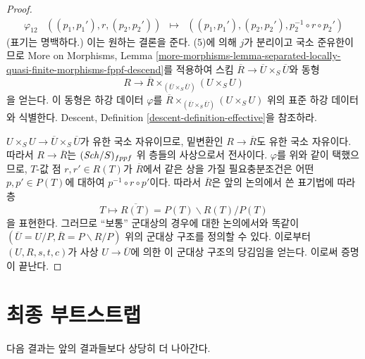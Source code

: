 \begin{proof}
$$\begin{matrix}
\varphi_{12} & ((p_1, p_1'), r, (p_2, p_2')) & \mapsto &
((p_1, p_1'), (p_2, p_2'), p_2^{-1} \circ r \circ p_2')
\end{matrix}
$$
(표기는 명백하다.) 이는 원하는 결론을 준다. (5)에 의해 $j$가 분리이고
국소 준유한이므로 More on Morphisms, Lemma
\ref{more-morphisms-lemma-separated-locally-quasi-finite-morphisms-fppf-descend}를
적용하여 스킴 $\overline{R} \to \overline{U} \times_S \overline{U}$와 동형
$$
R \to \overline{R} \times_{(\overline{U} \times_S \overline{U})} (U \times_S U)
$$
을 얻는다. 이 동형은 하강 데이터 $\varphi$를
$\overline{R} \times_{(\overline{U} \times_S \overline{U})} (U \times_S U)$
위의 표준 하강 데이터와 식별한다. Descent, Definition
\ref{descent-definition-effective}을 참조하라.

\medskip\noindent
$U \times_S U \to \overline{U} \times_S \overline{U}$가 유한 국소
자유이므로, 밑변환인 $R \to \overline{R}$도 유한 국소 자유이다.
따라서 $R \to \overline{R}$는 $(\mathit{Sch}/S)_{fppf}$ 위 층들의 사상으로서
전사이다. $\varphi$를 위와 같이 택했으므로, $T$-값 점
$r, r' \in R(T)$가 $\overline{R}$에서 같은 상을 가질 필요충분조건은
어떤 $p, p' \in P(T)$에 대하여 $p^{-1} \circ r \circ p'$이다.
따라서 $\overline{R}$은 앞의 논의에서 쓴 표기법에 따라 층
$$
T \longmapsto  \overline{R(T)} = P(T)\backslash R(T)/P(T)
$$
을 표현한다. 그러므로 ``보통'' 군대상의 경우에 대한 논의에서와 똑같이
$(\overline{U} = U/P, \overline{R} = P\backslash R/P)$ 위의 군대상 구조를
정의할 수 있다. 이로부터 $(U, R, s, t, c)$가 사상
$U \to \overline{U}$에 의한 이 군대상 구조의 당김임을 얻는다.
이로써 증명이 끝난다.
\end{proof}
 
\section{최종 부트스트랩}
\label{section-final-bootstrap}

\noindent
다음 결과는 앞의 결과들보다 상당히 더 나아간다.

